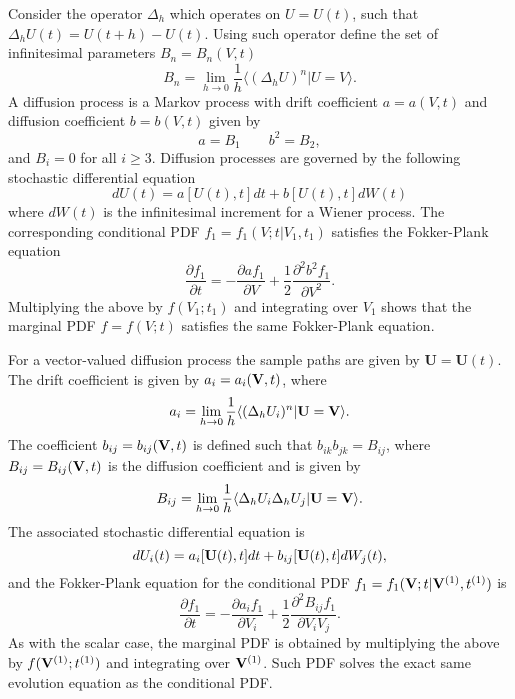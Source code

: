 \documentclass[oneside,a4paper,11pt]{report}
\begin{document}
Consider the operator $\Delta_h$ which operates on $U = U(t)$, such that $\Delta_hU(t) = U(t+h) - U(t)$. Using such operator define the set of infinitesimal parameters $B_n = B_n(V,t)$
\begin{equation}
B_n = \lim_{h\to0} \frac{1}{h} \langle ( \Delta_h U )^n | U = V \rangle.
\end{equation}
A diffusion process is a Markov process with drift coefficient $a = a(V,t)$ and diffusion coefficient $b = b(V,t)$ given by
\begin{equation}
a = B_1 \qquad
b^2 = B_2,
\end{equation}
and $B_i = 0$ for all $i \ge 3$. Diffusion processes  are governed by the following stochastic differential equation
\begin{equation}
dU(t) = a[U(t),t] dt + b[U(t),t] dW(t)
\end{equation}
where $dW(t)$ is the infinitesimal increment for a Wiener process. The corresponding conditional PDF $f_1 = f_1(V;t | V_1,t_1)$ satisfies the Fokker-Plank equation
\begin{equation}
\frac{\partial f_1}{\partial t} = - \frac{\partial a f_1}{\partial V} + \frac{1}{2} \frac{\partial ^2 b^2 f_1}{\partial V^2}.
\end{equation}
Multiplying the above by $f(V_1;t_1)$ and integrating over $V_1$ shows that the marginal PDF $f = f(V;t)$ satisfies the same Fokker-Plank equation.

For a vector-valued diffusion process the sample paths are given by $\mathbf{U} =  \mathbf{U}(t)$. The drift coefficient is given by $a_i = a_i(\mathbf{V},t)$, where
\begin{equation}
a_i = \lim_{h\to0} \frac{1}{h} \langle ( \Delta_h U_i )^n | \mathbf{U} = \mathbf{V} \rangle.
\end{equation}
The coefficient $b_{ij} = b_{ij}(\mathbf{V}, t)$ is defined such that $b_{ik}b_{jk} = B_{ij}$, where $B_{ij} = B_{ij}(\mathbf{V},t)$ is the diffusion coefficient and is given by
\begin{equation}
B_{ij} = \lim_{h\to0} \frac{1}{h} \langle \Delta_h U_i \Delta_h U_j  | \mathbf{U} = \mathbf{V} \rangle.
\end{equation}
The associated stochastic differential equation is
\begin{equation}
dU_i(t) = a_i[\bold{U}(t),t] dt + b_{ij} [\bold{U}(t),t] dW_j(t),
\end{equation}
and the Fokker-Plank equation for the conditional PDF $f_1 = f_1(\mathbf{V}; t| \mathbf{V}^{(1)}, t^{(1)})$ is
\begin{equation}
\label{fokkerplank_3d}
\frac{\partial f_1}{\partial t} = - \frac{\partial a_i f_1}{\partial V_i} + \frac{1}{2} \frac{\partial^2 B_{ij} f_1}{\partial V_i V_j}.
\end{equation}
As with the scalar case, the marginal PDF is obtained by multiplying the above by $f(\bold{V}^{(1)};t^{(1)})$ and integrating over $\bold{V}^{(1)}$. Such PDF solves the exact same evolution equation as the conditional PDF.
\end{document}
